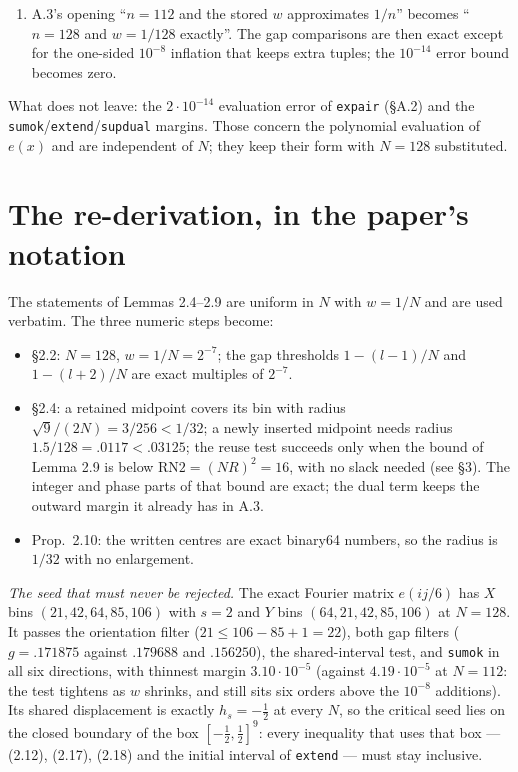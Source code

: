 \documentclass[11pt]{article}
\begin{document}
\begin{enumerate}
  With the threshold exact, the seed arithmetic collapses to one integer comparison. The cheap test
  reads $s+a+9/4<16$ with $s=\|k_X\|^2$ and $a=\|k_Y\|_1$ non-negative integers, i.e.\
  \[
    s+a\le 13,
  \]
  with no floating point in the decision at all. That single line is where the whole of A.3's seed
  arithmetic now lives, and it is why the choice among $16$, $16-10^{-4}$ and $16-2^{-14}$ is
  cosmetic: the left side is quantised to integers plus $9/4$, so all three give the same cut.
\item A.3's opening ``$n=112$ and the stored $w$ approximates $1/n$'' becomes ``$n=128$ and
  $w=1/128$ exactly''. The gap comparisons are then exact except for the one-sided $10^{-8}$
  inflation that keeps extra tuples; the $10^{-14}$ error bound becomes zero.
\end{enumerate}

\noindent
What does not leave: the $2\cdot10^{-14}$ evaluation error of \texttt{expair} (\S A.2) and the
\texttt{sumok}/\texttt{extend}/\texttt{supdual} margins. Those concern the polynomial evaluation
of $e(x)$ and are independent of $N$; they keep their form with $N=128$ substituted.

\section{The re-derivation, in the paper's notation}

The statements of Lemmas 2.4--2.9 are uniform in $N$ with $w=1/N$ and are used verbatim. The
three numeric steps become:
\begin{itemize}
\item \S2.2: $N=128$, $w=1/N=2^{-7}$; the gap thresholds $1-(l-1)/N$ and $1-(l+2)/N$ are exact
  multiples of $2^{-7}$.
\item \S2.4: a retained midpoint covers its bin with radius
  $\sqrt{9}/(2N)=3/256<1/32$; a newly inserted midpoint needs radius
  $1.5/128=.0117<.03125$; the reuse test succeeds only when the bound of Lemma 2.9 is below
  $\mathrm{RN2}=(NR)^2=16$, with no slack needed (see \S3). The integer and phase parts of that
  bound are exact; the dual term keeps the outward margin it already has in A.3.
\item Prop.\ 2.10: the written centres are exact binary64 numbers, so the radius is $1/32$ with no
  enlargement.
\end{itemize}

\noindent
\emph{The seed that must never be rejected.} The exact Fourier matrix $e(ij/6)$ has $X$ bins
$(21,42,64,85,106)$ with $s=2$ and $Y$ bins $(64,21,42,85,106)$ at $N=128$. It passes the
orientation filter ($21\le106-85+1=22$), both gap filters ($g=.171875$ against $.179688$ and
$.156250$), the shared-interval test, and \texttt{sumok} in all six directions, with thinnest
margin $3.10\cdot10^{-5}$ (against $4.19\cdot10^{-5}$ at $N=112$: the test tightens as $w$ shrinks,
and still sits six orders above the $10^{-8}$ additions). Its shared displacement is exactly
$h_s=-\tfrac12$ at every $N$, so the critical seed lies on the closed boundary of the box
$[-\tfrac12,\tfrac12]^9$: every inequality that uses that box --- (2.12), (2.17), (2.18) and the
initial interval of \texttt{extend} --- must stay inclusive.
\end{document}
